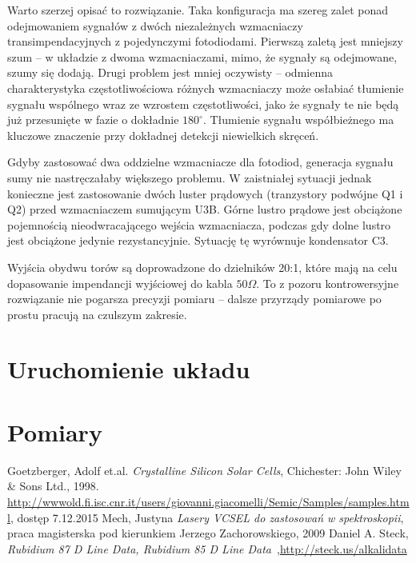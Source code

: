 \documentclass[a4paper,10pt]{article}
\begin{document}
Warto szerzej opisać to rozwiązanie. Taka konfiguracja ma szereg zalet ponad odejmowaniem sygnałów z dwóch niezależnych wzmacniaczy transimpendacyjnych z pojedynczymi fotodiodami.
Pierwszą zaletą jest mniejszy szum -- w układzie z dwoma wzmacniaczami, mimo, że sygnały są odejmowane, szumy się dodają. Drugi problem jest mniej oczywisty -- odmienna charakterystyka częstotliwościowa różnych wzmacniaczy może osłabiać tłumienie sygnału wspólnego wraz ze wzrostem częstotliwości, jako że sygnały te nie będą już przesunięte w fazie o dokładnie $180^{\circ}$. Tłumienie sygnału współbieżnego ma kluczowe znaczenie przy dokładnej detekcji niewielkich skręceń.

Gdyby zastosować dwa oddzielne wzmacniacze dla fotodiod, generacja sygnału sumy nie nastręczałaby większego problemu. W zaistniałej sytuacji jednak konieczne jest zastosowanie dwóch luster prądowych (tranzystory podwójne Q1 i Q2) przed wzmacniaczem sumującym U3B. Górne lustro prądowe jest obciążone pojemnością nieodwracającego wejścia wzmacniacza, podczas gdy dolne lustro jest obciążone jedynie rezystancyjnie. Sytuację tę wyrównuje kondensator C3. 

Wyjścia obydwu torów są doprowadzone do dzielników 20:1, które mają na celu dopasowanie impendancji wyjściowej do kabla $50\Omega$. To z pozoru kontrowersyjne rozwiązanie nie pogarsza precyzji pomiaru -- dalsze przyrządy pomiarowe po prostu pracują na czulszym zakresie.

\section{Uruchomienie układu}


\section{Pomiary}


\begin{thebibliography}{99}
 Goetzberger, Adolf et.al. \emph{Crystalline Silicon Solar Cells}, Chichester: John Wiley \& Sons Ltd., 1998.
 \url{http://wwwold.fi.isc.cnr.it/users/giovanni.giacomelli/Semic/Samples/samples.html}, dostęp 7.12.2015
  Mech, Justyna \emph{Lasery VCSEL do zastosowań w spektroskopii}, praca magisterska pod kierunkiem Jerzego Zachorowskiego, 2009
 Daniel A. Steck, \emph{Rubidium 87 D Line Data, Rubidium 85 D Line Data}~,\url{http://steck.us/alkalidata}

\end{thebibliography}
\end{document}

